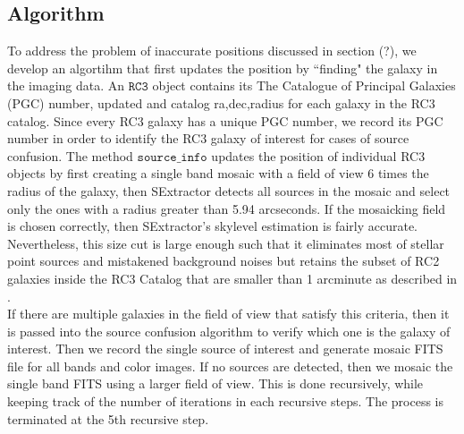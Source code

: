 \documentclass[5p]{elsarticle}
\begin{document}
	\subsection{Algorithm}
	To address the problem of inaccurate positions discussed in section (?), we develop an algortihm that first updates the position by ``finding" the galaxy in the imaging data. 
	An  $\texttt{RC3}$ object contains its The Catalogue of Principal Galaxies (PGC) number, updated and catalog ra,dec,radius for each galaxy in the RC3 catalog. Since every RC3 galaxy has a unique PGC number, we record  its PGC number in order to identify the RC3 galaxy of interest for cases of source confusion. The method $\texttt{source\_info}$ updates the position of individual RC3 objects by first creating a single band mosaic with a field of view 6 times the radius of the galaxy, then SExtractor detects all sources in the mosaic and select only the ones with a radius greater than 5.94 arcseconds.  If the mosaicking field is chosen correctly, then SExtractor's skylevel estimation is fairly accurate.  Nevertheless, this size cut is large enough such that it eliminates most of stellar point sources and mistakened background noises  but retains the subset of RC2 galaxies inside the RC3 Catalog that are smaller than 1 arcminute as described in \citet{rc2}. 
\\
\indent If there are multiple galaxies in the field of view that satisfy this criteria, then it is passed into the source confusion algorithm to verify which one is the galaxy of interest. Then we record the single source of interest and generate mosaic FITS file for all bands and color images. If no sources are detected, then we mosaic  the single band FITS using a larger field of view. This is done recursively, while keeping track of the number of iterations in each recursive steps. The process is terminated at the 5th recursive step. %
\end{document}
